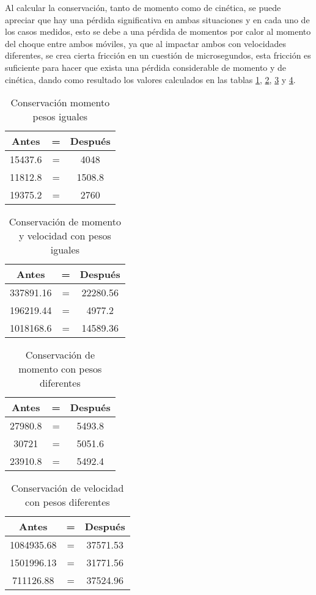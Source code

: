 \documentclass{article}
\begin{document}
Al calcular la conservación, tanto de momento como de cinética, se puede apreciar que hay una pérdida significativa en ambas situaciones y en cada uno de los casos medidos, esto se debe a una pérdida de momentos por calor al momento del choque entre ambos móviles, ya que al impactar ambos con velocidades diferentes, se crea cierta fricción en un cuestión de microsegundos, esta fricción es suficiente para hacer que exista una pérdida considerable de momento y de cinética, dando como resultado los valores calculados en las tablas \ref{tab:x}, \ref{tab:y}, \ref{tab:w} y \ref{tab:z}.

\begin{table}[H]
\centering
\begin{tabular}{|c|c|c|}
\hline
Antes & = & Después \\
\hline
15437.6 & = & 4048 \\
\hline
11812.8 & = & 1508.8 \\
\hline
19375.2 & = & 2760 \\
\hline
\end{tabular}
\caption{Conservación momento pesos iguales}
\label{tab:x}
\end{table}

\begin{table}[H]
\centering
\begin{tabular}{|c|c|c|}
\hline
Antes & = & Después \\
\hline
 337891.16 & = & 22280.56 \\
\hline
  196219.44 & = & 4977.2 \\
\hline
 1018168.6 & = & 14589.36  \\
\hline
\end{tabular}
\caption{Conservación de momento y velocidad con pesos iguales}
\label{tab:y}
\end{table}

\begin{table}[H]
\centering
\begin{tabular}{|c|c|c|}
\hline
Antes & = & Después \\
\hline
27980.8 & = & 5493.8  \\
\hline
30721 & = & 5051.6  \\
\hline
23910.8 & = & 5492.4 \\
\hline
\end{tabular}
\caption{Conservación de momento con pesos diferentes}
\label{tab:w}
\end{table}

\begin{table}[H]
\centering
\begin{tabular}{|c|c|c|}
\hline
Antes & = & Después  \\
\hline
1084935.68 & = & 37571.53  \\
\hline
1501996.13 & = & 31771.56  \\
\hline
711126.88 & = & 37524.96  \\
\hline
\end{tabular}
\caption{Conservación de velocidad con pesos diferentes}
\label{tab:z}
\end{table}
\end{document}
